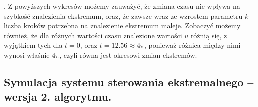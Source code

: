 \documentclass[a4paper,10pt]{article}
\begin{document}
\newpage . \newpage Z powyższych wykresów możemy zauważyć, że zmiana czasu nie wpływa na szybkość znalezienia ekstremum, oraz, że zawsze wraz ze wzrostem parametru $k$ liczba kroków potrzebna na znalezienie ekstremum maleje. Zobaczyć możemy również, że dla różnych wartości czasu znalezione wartości $u$ różnią się, z wyjątkiem tych dla $t=0$, oraz $t=12.56 \approx 4\pi$, ponieważ różnica między nimi wynosi właśnie $4\pi$, czyli równa jest okresowi zmian ekstremów.

\subsection{Symulacja systemu sterowania ekstremalnego – wersja 2. algorytmu.}
\end{document}
